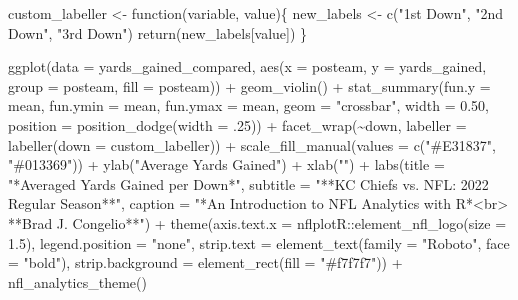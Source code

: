 \documentclass[
  letterpaper,
]{krantz}
\newenvironment{Shaded}{\begin{snugshade}}{\end{snugshade}}
\newcommand{\AttributeTok}[1]{\textcolor[rgb]{0.40,0.45,0.13}{#1}}
\newcommand{\ControlFlowTok}[1]{\textcolor[rgb]{0.00,0.23,0.31}{#1}}
\newcommand{\DecValTok}[1]{\textcolor[rgb]{0.68,0.00,0.00}{#1}}
\newcommand{\FloatTok}[1]{\textcolor[rgb]{0.68,0.00,0.00}{#1}}
\newcommand{\FunctionTok}[1]{\textcolor[rgb]{0.28,0.35,0.67}{#1}}
\newcommand{\NormalTok}[1]{\textcolor[rgb]{0.00,0.23,0.31}{#1}}
\newcommand{\OtherTok}[1]{\textcolor[rgb]{0.00,0.23,0.31}{#1}}
\newcommand{\SpecialCharTok}[1]{\textcolor[rgb]{0.37,0.37,0.37}{#1}}
\newcommand{\StringTok}[1]{\textcolor[rgb]{0.13,0.47,0.30}{#1}}
\begin{document}
\begin{Shaded}
\begin{Highlighting}[]
\NormalTok{custom\_labeller }\OtherTok{\textless{}{-}} \ControlFlowTok{function}\NormalTok{(variable, value)\{}
\NormalTok{  new\_labels }\OtherTok{\textless{}{-}} \FunctionTok{c}\NormalTok{(}\StringTok{"1st Down"}\NormalTok{, }\StringTok{"2nd Down"}\NormalTok{, }\StringTok{"3rd Down"}\NormalTok{)}
  \FunctionTok{return}\NormalTok{(new\_labels[value])}
\NormalTok{\}}

\FunctionTok{ggplot}\NormalTok{(}\AttributeTok{data =}\NormalTok{ yards\_gained\_compared, }\FunctionTok{aes}\NormalTok{(}\AttributeTok{x =}\NormalTok{ posteam,}
                                         \AttributeTok{y =}\NormalTok{ yards\_gained,}
                                         \AttributeTok{group =}\NormalTok{ posteam,}
                                         \AttributeTok{fill =}\NormalTok{ posteam)) }\SpecialCharTok{+}
  \FunctionTok{geom\_violin}\NormalTok{() }\SpecialCharTok{+}
  \FunctionTok{stat\_summary}\NormalTok{(}\AttributeTok{fun.y =}\NormalTok{ mean, }\AttributeTok{fun.ymin =}\NormalTok{ mean, }\AttributeTok{fun.ymax =}\NormalTok{ mean,}
               \AttributeTok{geom =} \StringTok{"crossbar"}\NormalTok{,}
               \AttributeTok{width =} \FloatTok{0.50}\NormalTok{,}
               \AttributeTok{position =} \FunctionTok{position\_dodge}\NormalTok{(}\AttributeTok{width =}\NormalTok{ .}\DecValTok{25}\NormalTok{)) }\SpecialCharTok{+}
  \FunctionTok{facet\_wrap}\NormalTok{(}\SpecialCharTok{\textasciitilde{}}\NormalTok{down, }\AttributeTok{labeller =} \FunctionTok{labeller}\NormalTok{(}\AttributeTok{down =}\NormalTok{ custom\_labeller)) }\SpecialCharTok{+}
  \FunctionTok{scale\_fill\_manual}\NormalTok{(}\AttributeTok{values =} \FunctionTok{c}\NormalTok{(}\StringTok{"\#E31837"}\NormalTok{, }\StringTok{"\#013369"}\NormalTok{)) }\SpecialCharTok{+}
  \FunctionTok{ylab}\NormalTok{(}\StringTok{"Average Yards Gained"}\NormalTok{) }\SpecialCharTok{+}
  \FunctionTok{xlab}\NormalTok{(}\StringTok{""}\NormalTok{) }\SpecialCharTok{+}
  \FunctionTok{labs}\NormalTok{(}\AttributeTok{title =} \StringTok{"*Averaged Yards Gained per Down*"}\NormalTok{,}
       \AttributeTok{subtitle =} \StringTok{"**KC Chiefs vs. NFL: 2022 Regular Season**"}\NormalTok{,}
       \AttributeTok{caption =} \StringTok{"*An Introduction to NFL Analytics with R*\textless{}br\textgreater{}}
\StringTok{       **Brad J. Congelio**"}\NormalTok{) }\SpecialCharTok{+}
  \FunctionTok{theme}\NormalTok{(}\AttributeTok{axis.text.x =}\NormalTok{ nflplotR}\SpecialCharTok{::}\FunctionTok{element\_nfl\_logo}\NormalTok{(}\AttributeTok{size =} \FloatTok{1.5}\NormalTok{),}
        \AttributeTok{legend.position =} \StringTok{"none"}\NormalTok{,}
        \AttributeTok{strip.text =} \FunctionTok{element\_text}\NormalTok{(}\AttributeTok{family =} \StringTok{"Roboto"}\NormalTok{, }\AttributeTok{face =} \StringTok{"bold"}\NormalTok{),}
        \AttributeTok{strip.background =} \FunctionTok{element\_rect}\NormalTok{(}\AttributeTok{fill =} \StringTok{"\#f7f7f7"}\NormalTok{)) }\SpecialCharTok{+}
  \FunctionTok{nfl\_analytics\_theme}\NormalTok{()}
\end{Highlighting}
\end{Shaded}
\end{document}
